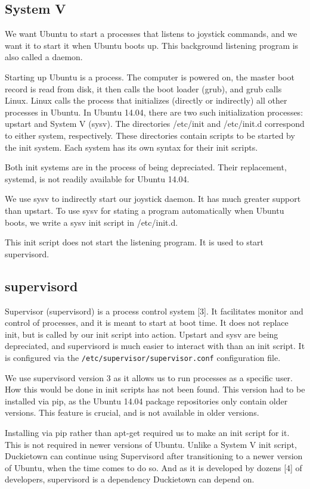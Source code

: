 \documentclass[titlepage]{article}
\begin{document}
\subsection{System V}
We want Ubuntu  to start a processes that listens to joystick commands, and we want it to start it when Ubuntu boots up. This background listening program is also called a daemon. 

Starting up Ubuntu is a process. The computer is powered on, the master boot record is read from disk, it then calls the boot loader (grub), and grub calls Linux. Linux calls the process that initializes (directly or indirectly) all other processes in Ubuntu. 
In Ubuntu 14.04, there are two such initialization processes: upstart and System V (sysv). %
The directories /etc/init and /etc/init.d correspond to either system, respectively. These directories contain scripts to be started by the init system. Each system has its own syntax for their init scripts. 

Both init systems are in the process of being depreciated. Their replacement, systemd, is not readily available for Ubuntu 14.04. 

We use sysv to indirectly start our joystick daemon. It has much greater support than upstart. To use sysv for stating a program automatically when Ubuntu boots, we write a sysv init script in /etc/init.d.

This init script does not start the listening program. It is used to start supervisord. 
\subsection{supervisord}
Supervisor (supervisord) is a process control system [3]. It facilitates monitor and control of processes, and it is meant to start at boot time. It does not replace init, but is called by our init script into action. Upstart and sysv are being depreciated, and supervisord is much easier to interact with than an init script. It is configured via the \texttt{/etc/supervisor/supervisor.conf} configuration file.

We use supervisord version 3 as it allows us to run processes as a specific user. How this would be done in init scripts has not been found. This version had to be installed via pip, as the Ubuntu 14.04 package repositories only contain older versions. This feature is crucial, and is not available in older versions. 

Installing via pip rather than apt-get required us to make an init script for it. This is not required in newer versions of Ubuntu. Unlike a System V init script, Duckietown can continue using Supervisord after transitioning to a newer version of Ubuntu, when the time comes to do so. And as it is developed by dozens [4] of developers, supervisord is a dependency Duckietown can depend on.
\end{document}
